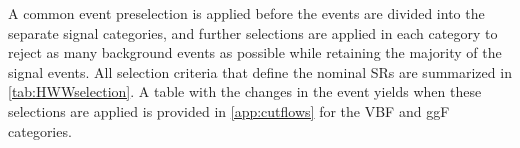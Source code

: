 



A common event preselection is applied before the events are divided into the separate signal categories, and further selections are applied in each category to reject as many background events as possible while retaining the majority of the signal events.
All selection criteria that define the nominal SRs are summarized in \cref{tab:HWWselection}. 
A table with the changes in the event yields when these selections are applied is provided in \cref{app:cutflows} for the VBF and ggF \TwoJet categories. 

\begin{table}[!ht]
    \centering
    \caption[Event selection criteria used to define the nominal signal regions.]{
    Event selection criteria used to define the nominal signal regions in the \hww\ analysis. The definitions of the variables can be found in the text.
    \label{tab:HWWselection}
    }
    \resizebox{\textwidth}{!}{
    
    }
\end{table}

